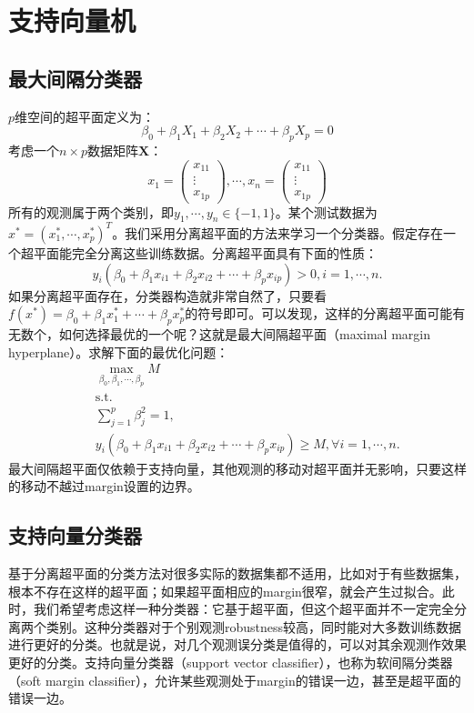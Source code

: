 \documentclass[hyperref,]{ctexart}
\begin{document}
\section{支持向量机}

\subsection{最大间隔分类器}

\(p\)维空间的超平面定义为：
\[\beta_0+\beta_1X_1+\beta_2X_2+\cdots+\beta_pX_p=0\]
考虑一个\(n\times p\)数据矩阵\(\mathbf{X}\)： \[x_1=\left(
\begin{array}{c}
x_{11} \\
\vdots \\
x_{1p}
\end{array}
\right),\cdots,x_n=\left(
\begin{array}{c}
x_{11} \\
\vdots \\
x_{1p}
\end{array}
\right)
\]
所有的观测属于两个类别，即\(y_1,\cdots,y_n\in \{-1,1\}\)。某个测试数据为\(x^*=\left(x_1^*,\cdots,x_p^*\right)^T\)。我们采用分离超平面的方法来学习一个分类器。假定存在一个超平面能完全分离这些训练数据。分离超平面具有下面的性质：
\[y_i(\beta_0+\beta_1 x_{i1}+\beta_2 x_{i2}+\cdots+\beta_p x_{ip})>0,i=1,\cdots,n.\]
如果分离超平面存在，分类器构造就非常自然了，只要看\(f(x^*)=\beta_0+\beta_1x_1^*+\cdots+\beta_px_p^*\)的符号即可。可以发现，这样的分离超平面可能有无数个，如何选择最优的一个呢？这就是最大间隔超平面（maximal
margin hyperplane）。求解下面的最优化问题： \[
\begin{eqnarray}
&& \max_{\beta_0,\beta_1,\cdots,\beta_p} M \\
&& \mathrm{s.t.} \\
&& \sum_{j=1}^p \beta_j^2 =1, \\
&& y_i(\beta_0 + \beta_1 x_{i1}+\beta_2x_{i2}+\cdots+\beta_px_{ip})\geq M, \forall i=1,\cdots,n.
\end{eqnarray}
\]
最大间隔超平面仅依赖于支持向量，其他观测的移动对超平面并无影响，只要这样的移动不越过margin设置的边界。

\subsection{支持向量分类器}

基于分离超平面的分类方法对很多实际的数据集都不适用，比如对于有些数据集，根本不存在这样的超平面；如果超平面相应的margin很窄，就会产生过拟合。此时，我们希望考虑这样一种分类器：它基于超平面，但这个超平面并不一定完全分离两个类别。这种分类器对于个别观测robustness较高，同时能对大多数训练数据进行更好的分类。也就是说，对几个观测误分类是值得的，可以对其余观测作效果更好的分类。支持向量分类器（support
vector classifier），也称为软间隔分类器（soft margin
classifier），允许某些观测处于margin的错误一边，甚至是超平面的错误一边。
\end{document}
